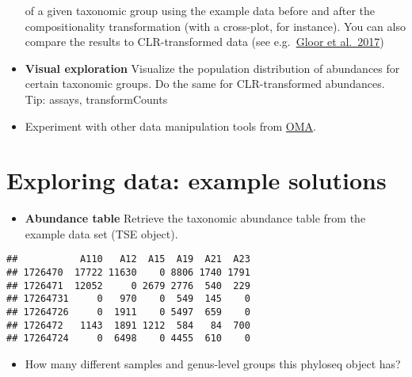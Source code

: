 \documentclass[
  oneside]{book}
\newenvironment{Shaded}{\begin{snugshade}}{\end{snugshade}}
\newcommand{\CommentTok}[1]{\textcolor[rgb]{0.56,0.35,0.01}{\textit{#1}}}
\newcommand{\DecValTok}[1]{\textcolor[rgb]{0.00,0.00,0.81}{#1}}
\newcommand{\FunctionTok}[1]{\textcolor[rgb]{0.00,0.00,0.00}{#1}}
\newcommand{\NormalTok}[1]{#1}
\newcommand{\SpecialCharTok}[1]{\textcolor[rgb]{0.00,0.00,0.00}{#1}}
\providecommand{\tightlist}{%
  \setlength{\itemsep}{0pt}\setlength{\parskip}{0pt}}
\begin{document}
\begin{itemize}
  of a given taxonomic group using the example data before and after
  the compositionality transformation (with a cross-plot, for
  instance). You can also compare the results to CLR-transformed data
  (see e.g.~\href{https://www.frontiersin.org/articles/10.3389/fmicb.2017.02224/full}{Gloor et
  al.~2017})
\item
  \textbf{Visual exploration} Visualize the population distribution of
  abundances for certain taxonomic groups. Do the same for
  CLR-transformed abundances. Tip: assays, transformCounts
\item
  Experiment with other data manipulation tools from
  \href{https://microbiome.github.io/OMA/taxonomic-information.html\#functions-to-access-taxonomic-information}{OMA}.
\end{itemize}

\hypertarget{exploring-data-example-solutions}{%
\section{Exploring data: example solutions}\label{exploring-data-example-solutions}}

\begin{itemize}
\tightlist
\item
  \textbf{Abundance table} Retrieve the taxonomic abundance table from the
  example data set (TSE object).
\end{itemize}

\begin{Shaded}
\end{Shaded}

\begin{verbatim}
##           A110   A12  A15  A19  A21  A23
## 1726470  17722 11630    0 8806 1740 1791
## 1726471  12052     0 2679 2776  540  229
## 17264731     0   970    0  549  145    0
## 17264726     0  1911    0 5497  659    0
## 1726472   1143  1891 1212  584   84  700
## 17264724     0  6498    0 4455  610    0
\end{verbatim}

\begin{itemize}
\tightlist
\item
  How many different samples and genus-level groups this phyloseq
  object has?
\end{itemize}
\end{document}
